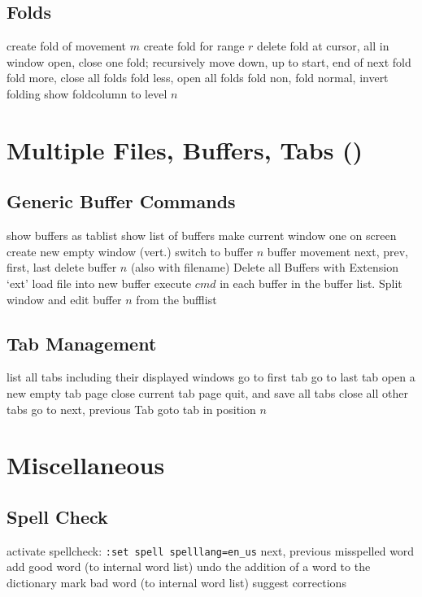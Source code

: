 \subsection{Folds}	{}
	{create fold of movement $m$}
	{create fold for range $r$}
	{delete fold at cursor, all in window}
	{open, close one fold; recursively}
	{move down, up to start, end of next fold}
	{fold more, close all folds}
	{fold less, open all folds}
	{fold non, fold normal, invert folding}
	{show foldcolumn to level $n$}

\section{Multiple Files, Buffers, Tabs (\enter)}	{}
\subsection{Generic Buffer Commands}	{}
	{show buffers as tablist}
	{show list of buffers}
	{make current window one on screen}
	{create new empty window (vert.)}
	{switch to buffer $n$}
	{buffer movement next, prev, first, last}
	{delete buffer $n$ (also with filename)}
	{Delete all Buffers with Extension `ext'}
	{load file into new buffer}
	{execute $cmd$ in each buffer in the buffer list.}
	{Split window and edit buffer $n$ from the bufflist}

\subsection{Tab Management}	{}
	{list all tabs including their displayed windows}
	{go to first tab}
	{go to last tab}
	{open a new empty tab page}
	{close current tab page}
	{quit, and save all tabs}
	{close all other tabs}
	{go to next, previous Tab}
	{goto tab in position $n$ }

\section{Miscellaneous}	{}
\subsection{Spell Check}	{activate spellcheck: {\tt :set spell spelllang=en\_us}}
\cmdS{]s\ [s }	{next, previous misspelled word}
	{add good word (to internal word list)}
	{undo the addition of a word to the dictionary}
	{mark bad word (to internal word list)}
	{suggest corrections}

